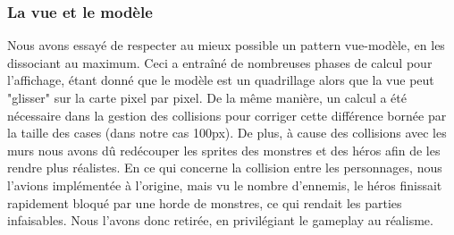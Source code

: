 	\subsubsection{La vue et le modèle}

Nous avons essayé de respecter au mieux possible un pattern vue-modèle, en les dissociant au maximum. Ceci a entraîné de nombreuses phases de calcul pour l'affichage, étant donné que le modèle est un quadrillage alors que la vue peut "glisser" sur la carte pixel par pixel. De la même manière, un calcul a été nécessaire dans la gestion des collisions pour corriger cette différence bornée par la taille des cases (dans notre cas 100px). De plus, à cause des collisions avec les murs nous avons dû redécouper les sprites des monstres et des héros afin de les rendre plus réalistes. En ce qui concerne la collision entre les personnages, nous l'avions implémentée à l'origine, mais vu le nombre d'ennemis, le héros finissait rapidement bloqué par une horde de monstres, ce qui rendait les parties infaisables. Nous l'avons donc retirée, en privilégiant le gameplay au réalisme.
